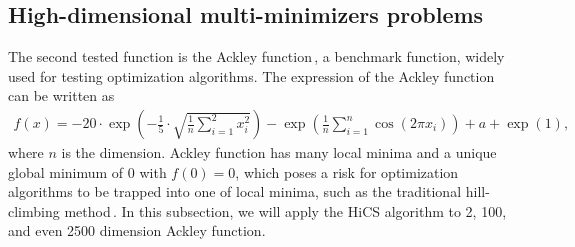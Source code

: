 \documentclass[final,1p,times]{elsarticle}
\begin{document}
\newpage

\subsection{High-dimensional multi-minimizers problems}
\label{subsec:minmulit}

The second tested function is the Ackley
function\,\cite{dieterich2012empirical},
a benchmark function, widely used for
testing optimization algorithms.
The expression of the Ackley function can be written as
\begin{align}
	f(x) =
	-20\cdot\exp\left(-\frac{1}{5}\cdot\sqrt{\frac{1}{n}\sum_{i=1}^2
	x_i^2}\right)-
	\exp\left(\frac{1}{n}\sum_{i=1}^n \cos(2\pi x_i)\right)+a+\exp(1),
	\label{eqn:ackley}
\end{align}
where $n$ is the dimension.
Ackley function has many local minima and a unique global
minimum of $0$ with $f(0)=0$, which poses a risk for
optimization algorithms to be trapped into one of local
minima, such as the traditional hill-climbing method\,\cite{back1996evolutionary}.
In this subsection, we will apply the HiCS
algorithm to 2, 100, and even 2500 dimension Ackley function. 
\end{document}
